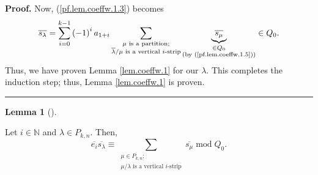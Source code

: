 \documentclass[numbers=enddot,12pt,final,onecolumn,notitlepage]{scrartcl}%
\theoremstyle{definition}
\newtheorem{lem}[theo]{Lemma}
\newenvironment{lemma}[1][]
{\begin{lem}[#1]\begin{leftbar}}
{\end{leftbar}\end{lem}}
\newenvironment{proof}[1][Proof]{\noindent\textbf{#1.} }{\ \rule{0.5em}{0.5em}}
\let\sumnonlimits\sum
\renewcommand{\sum}{\sumnonlimits\limits}
\begin{document}
\begin{proof}
Now, (\ref{pf.lem.coeffw.1.3}) becomes%
\[
\overline{s_{\lambda}}=\sum_{i=0}^{k-1}\left(  -1\right)  ^{i}a_{1+i}%
\sum_{\substack{\mu\text{ is a partition;}\\\overline{\lambda}/\mu\text{ is a
vertical }i\text{-strip}}}\underbrace{\overline{s_{\mu}}}_{\substack{\in
Q_{0}\\\text{(by (\ref{pf.lem.coeffw.1.5}))}}}\in Q_{0}.
\]
Thus, we have proven Lemma \ref{lem.coeffw.1} for our $\lambda$. This
completes the induction step; thus, Lemma \ref{lem.coeffw.1} is proven.
\end{proof}

\begin{lemma}
\label{lem.coeffw.eisl}Let $i\in\mathbb{N}$ and $\lambda\in P_{k,n}$. Then,%
\[
\overline{e_{i}}\overline{s_{\lambda}}\equiv\sum_{\substack{\mu\in
P_{k,n};\\\mu/\lambda\text{ is a vertical }i\text{-strip}}}\overline{s_{\mu}%
}\operatorname{mod}Q_{0}.
\]

\end{lemma}
\end{document}
